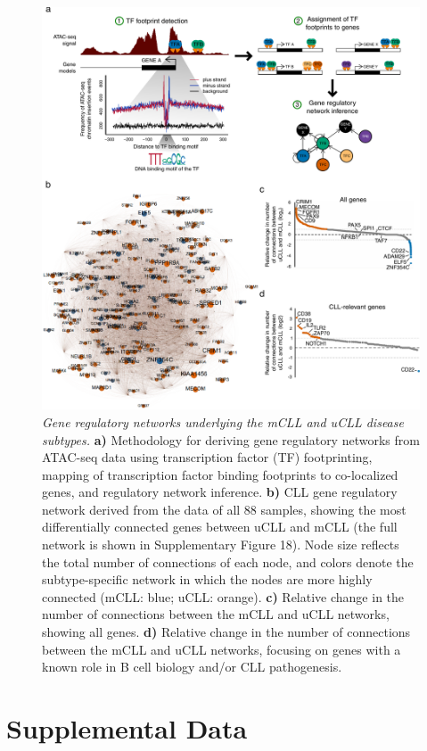 \documentclass[10pt,]{article}
\begin{document}
\begin{figure}
\centering
\includegraphics[width=1.000\hsize]{figures/Figure5.pdf}
\caption{\emph{Gene regulatory networks underlying the mCLL and uCLL
disease subtypes.} \textbf{a)} Methodology for deriving gene regulatory
networks from ATAC-seq data using transcription factor (TF)
footprinting, mapping of transcription factor binding footprints to
co-localized genes, and regulatory network inference. \textbf{b)} CLL
gene regulatory network derived from the data of all 88 samples, showing
the most differentially connected genes between uCLL and mCLL (the full
network is shown in Supplementary Figure 18). Node size reflects the
total number of connections of each node, and colors denote the
subtype-specific network in which the nodes are more highly connected
(mCLL: blue; uCLL: orange). \textbf{c)} Relative change in the number of
connections between the mCLL and uCLL networks, showing all genes.
\textbf{d)} Relative change in the number of connections between the
mCLL and uCLL networks, focusing on genes with a known role in B cell
biology and/or CLL pathogenesis.}\label{Figure5}
\end{figure}
\clearpage

\section{Supplemental Data}\label{supplemental-data}
\end{document}
